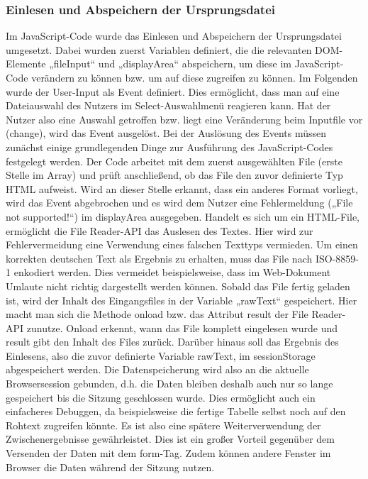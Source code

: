 {\subsubsection{Einlesen und Abspeichern der Ursprungsdatei}
Im JavaScript-Code wurde das Einlesen und Abspeichern der Ursprungsdatei umgesetzt. Dabei wurden zuerst Variablen definiert, die die relevanten DOM-Elemente „fileInput“ und „displayArea“ abspeichern, um diese im JavaScript-Code verändern zu können bzw. um auf diese zugreifen zu können. 
Im Folgenden wurde der User-Input als Event definiert. Dies ermöglicht, dass man auf eine Dateiauswahl des Nutzers im Select-Auswahlmenü reagieren kann. Hat der Nutzer also eine Auswahl getroffen bzw. liegt eine Veränderung beim Inputfile vor (change), wird das Event ausgelöst. Bei der Auslösung des Events müssen zunächst einige grundlegenden Dinge zur Ausführung des JavaScript-Codes festgelegt werden. 
Der Code arbeitet mit dem zuerst ausgewählten File (erste Stelle im Array) und prüft anschließend, ob das File den zuvor definierte Typ HTML aufweist. Wird an dieser Stelle erkannt, dass ein anderes Format vorliegt, wird das Event abgebrochen und es wird dem Nutzer eine Fehlermeldung („File not supported!“) im displayArea ausgegeben. 
Handelt es sich um ein HTML-File, ermöglicht die File Reader-\ac{API} das Auslesen des Textes. Hier wird zur Fehlervermeidung eine Verwendung eines falschen Texttyps vermieden. Um einen korrekten deutschen Text als Ergebnis zu erhalten, muss das File nach ISO-8859-1 enkodiert werden. Dies vermeidet beispielsweise, dass im Web-Dokument Umlaute nicht richtig dargestellt werden können. Sobald das File fertig geladen ist, wird der Inhalt des Eingangsfiles in der Variable „rawText“ gespeichert. Hier macht man sich die Methode onload bzw. das Attribut result der File Reader-API zunutze. Onload erkennt, wann das File komplett eingelesen wurde und result gibt den Inhalt des Files zurück. Darüber hinaus soll das Ergebnis des Einlesens, also die zuvor definierte Variable rawText, im sessionStorage abgespeichert werden. Die Datenspeicherung wird also an die aktuelle Browsersession gebunden, d.h. die Daten bleiben deshalb auch nur so lange gespeichert bis die Sitzung geschlossen wurde. Dies ermöglicht auch ein einfacheres Debuggen, da beispielsweise die fertige Tabelle selbst noch auf den Rohtext zugreifen könnte. Es ist also eine spätere Weiterverwendung der Zwischenergebnisse gewährleistet. Dies ist ein großer Vorteil gegenüber dem Versenden der Daten mit dem form-Tag. Zudem können andere Fenster im Browser die Daten während der Sitzung nutzen. 

}
